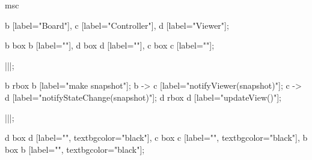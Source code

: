 \begin{msc}
msc {

b [label="Board"],
c [label="Controller"],
d [label="Viewer"];

b box b [label=""],
d box d [label=""],
c box c [label=""];

|||;

b rbox b [label="make snapshot"];
b -> c [label="notifyViewer(snapshot)"];
c -> d [label="notifyStateChange(snapshot)"];
d rbox d [label="updateView()"];

|||;

d box d [label="", textbgcolor="black"],
c box c [label="", textbgcolor="black"],
b box b [label="", textbgcolor="black"];

}
\end{msc}
